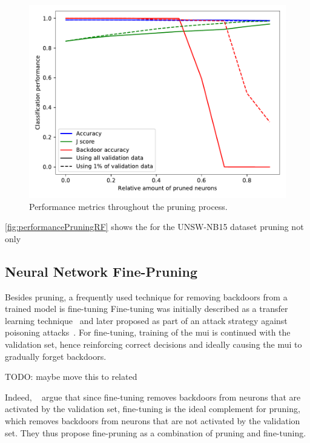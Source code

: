 \documentclass[10pt,sigconf,letterpaper,dvipsnames]{acmart}
\newcommand\note[2]{{\color{#1}#2}}
\newcommand\todo[1]{{\note{red}{TODO: #1}}}
\begin{document}
\begin{figure}[h]
\includegraphics[width=\columnwidth]{../prune_CAIA_backdoor_15/prune.pdf}
\caption{Performance metrics throughout the pruning process. }
\label{fig:performancePruningRF}
\end{figure}

\autoref{fig:performancePruningRF} shows the for the UNSW-NB15 dataset pruning not only 

\subsection{Neural Network Fine-Pruning}
Besides pruning, a frequently used technique for removing backdoors from a trained model is fine-tuning Fine-tuning was initially described as a transfer learning technique~\cite{yosinski_how_2014} and later proposed as part of an attack strategy against poisoning attacks~\cite{liu_fine-pruning:_2018}. For fine-tuning, training of the \gls{mui} is continued with the validation set, hence reinforcing correct decisions and ideally causing the \gls{mui} to gradually forget backdoors.

\todo{maybe move this to related}

Indeed, \citeauthor{liu_fine-pruning:_2018}~\cite{liu_fine-pruning:_2018} argue  that since fine-tuning removes backdoors from neurons that are activated by the validation set, fine-tuning is the ideal complement for pruning, which removes backdoors from neurons that are not activated by the validation set. They thus propose fine-pruning as a combination of pruning and fine-tuning.
\end{document}
